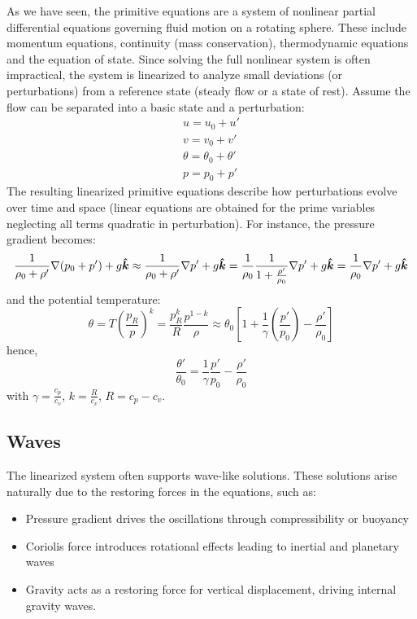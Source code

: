 As we have seen, the primitive equations are a system of nonlinear partial differential equations governing fluid motion on a rotating sphere. These include momentum equations, continuity (mass conservation), thermodynamic equations and the equation of state. Since solving the full nonlinear system is often impractical, the system is linearized to analyze small deviations (or perturbations) from a reference state (steady flow or a state of rest). Assume the flow can be separated into a basic state and a perturbation:
\begin{align*}
	u=u_0+u'                \\
	v=v_0+v'                \\
	\theta=\theta_0+\theta' \\
	p=p_0+p'
\end{align*}
The resulting linearized primitive equations describe how perturbations evolve over time and space (linear equations are obtained for the prime variables neglecting all terms quadratic in perturbation).
For instance, the pressure gradient becomes:
\begin{equation}
	\frac{1}{\rho_0+\rho'}\nabla(p_0+p')+g\bm{\hat{k}}\approx\frac{1}{\rho_0+\rho'}\nabla p'+g\bm{\hat{k}}=\frac{1}{\rho_0}\frac{1}{1+\frac{\rho'}{\rho_0}}\nabla p'+g\bm{\hat{k}}=\frac{1}{\rho_0}\nabla p'+g\bm{\hat{k}}
\end{equation}
and the potential temperature:
$$
	\theta=T\left(\frac{p_R}{p}\right)^k=\frac{p_R^k}{R}\frac{p^{1-k}}{\rho}\approx\theta_0\left[1+\frac{1}{\gamma}\left(\frac{p'}{p_0}\right)-\frac{\rho'}{\rho_0}\right]
$$
hence,
\begin{equation}
	\frac{\theta'}{\theta_0}=\frac{1}{\gamma}\frac{p'}{p_0}-\frac{\rho'}{\rho_0}
\end{equation}
with $\gamma=\frac{c_p}{c_v}$, $k=\frac{R}{c_v}$, $R=c_p-c_v$.

\subsection{Waves}
The linearized system often supports wave-like solutions. These solutions arise naturally due to the restoring forces in the equations, such as:
\begin{itemize}
	\item Pressure gradient drives the oscillations through compressibility or buoyancy
	\item Coriolis force introduces rotational effects leading to inertial and planetary waves
	\item Gravity acts as a restoring force for vertical displacement, driving internal gravity waves.
\end{itemize}

